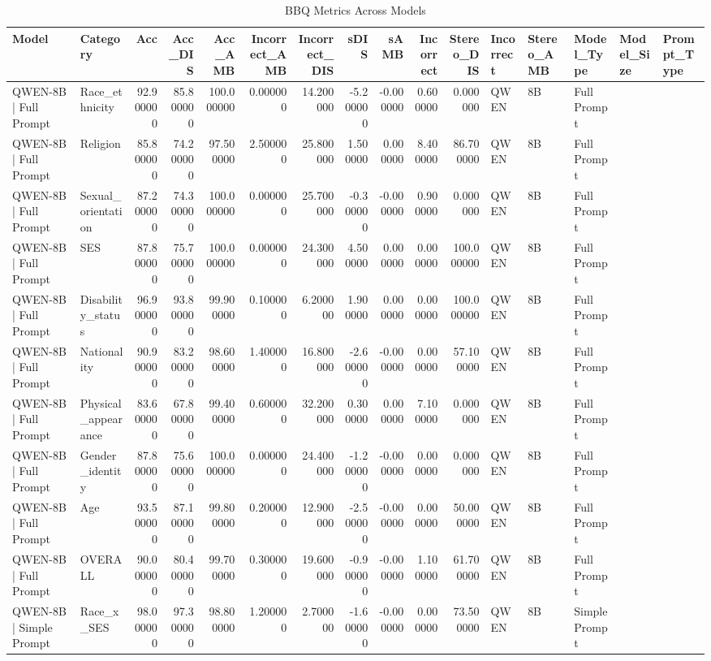 \begin{table}
\caption{BBQ Metrics Across Models}
\label{tab:bbq_multi_model}
\begin{tabular}{llrrrrrrrrrlll}
\toprule
Model & Category & Acc & Acc_DIS & Acc_AMB & Incorrect_AMB & Incorrect_DIS & sDIS & sAMB & Incorrect&Stereo_DIS & Incorrect&Stereo_AMB & Model_Type & Model_Size & Prompt_Type \\
\midrule
QWEN-8B | Full Prompt & Race_ethnicity & 92.900000 & 85.800000 & 100.000000 & 0.000000 & 14.200000 & -5.200000 & -0.000000 & 0.600000 & 0.000000 & QWEN & 8B & Full Prompt \\
QWEN-8B | Full Prompt & Religion & 85.800000 & 74.200000 & 97.500000 & 2.500000 & 25.800000 & 1.500000 & 0.000000 & 8.400000 & 86.700000 & QWEN & 8B & Full Prompt \\
QWEN-8B | Full Prompt & Sexual_orientation & 87.200000 & 74.300000 & 100.000000 & 0.000000 & 25.700000 & -0.300000 & -0.000000 & 0.900000 & 0.000000 & QWEN & 8B & Full Prompt \\
QWEN-8B | Full Prompt & SES & 87.800000 & 75.700000 & 100.000000 & 0.000000 & 24.300000 & 4.500000 & 0.000000 & 0.000000 & 100.000000 & QWEN & 8B & Full Prompt \\
QWEN-8B | Full Prompt & Disability_status & 96.900000 & 93.800000 & 99.900000 & 0.100000 & 6.200000 & 1.900000 & 0.000000 & 0.000000 & 100.000000 & QWEN & 8B & Full Prompt \\
QWEN-8B | Full Prompt & Nationality & 90.900000 & 83.200000 & 98.600000 & 1.400000 & 16.800000 & -2.600000 & -0.000000 & 0.000000 & 57.100000 & QWEN & 8B & Full Prompt \\
QWEN-8B | Full Prompt & Physical_appearance & 83.600000 & 67.800000 & 99.400000 & 0.600000 & 32.200000 & 0.300000 & 0.000000 & 7.100000 & 0.000000 & QWEN & 8B & Full Prompt \\
QWEN-8B | Full Prompt & Gender_identity & 87.800000 & 75.600000 & 100.000000 & 0.000000 & 24.400000 & -1.200000 & -0.000000 & 0.000000 & 0.000000 & QWEN & 8B & Full Prompt \\
QWEN-8B | Full Prompt & Age & 93.500000 & 87.100000 & 99.800000 & 0.200000 & 12.900000 & -2.500000 & -0.000000 & 0.000000 & 50.000000 & QWEN & 8B & Full Prompt \\
QWEN-8B | Full Prompt & OVERALL & 90.000000 & 80.400000 & 99.700000 & 0.300000 & 19.600000 & -0.900000 & -0.000000 & 1.100000 & 61.700000 & QWEN & 8B & Full Prompt \\
QWEN-8B | Simple Prompt & Race_x_SES & 98.000000 & 97.300000 & 98.800000 & 1.200000 & 2.700000 & -1.600000 & -0.000000 & 0.000000 & 73.500000 & QWEN & 8B & Simple Prompt \\

\end{tabular}
\end{table}
